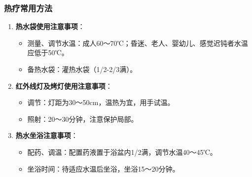 \documentclass[11pt, a4paper]{ctexart}
\begin{document}
\subsubsection{热疗常用方法}
\begin{enumerate}
    \item \textbf{热水袋使用注意事项}：
    \begin{itemize}
        \item 测量、调节水温：成人60～70℃；昏迷、老人、婴幼儿、感觉迟钝者水温应低于50℃。
        \item 备热水袋：灌热水袋（1/2-2/3满）。
    \end{itemize}
    \item \textbf{红外线灯及烤灯使用注意事项}：
    \begin{itemize}
        \item 调节：灯距为30～50cm，温热为宜，用手试温。
        \item 照射：20～30分钟，注意保护局部。
    \end{itemize}
    \item \textbf{热水坐浴注意事项}：
    \begin{itemize}
        \item 配药、调温：配置药液置于浴盆内1/2满，调节水温40～45℃。
        \item 坐浴时间：待适应水温后坐浴，坐浴15～20分钟。
    \end{itemize}
\end{enumerate}
\end{document}
